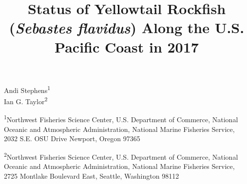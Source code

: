 \documentclass[12pt,]{article}
\title{Status of Yellowtail Rockfish (\emph{Sebastes flavidus}) Along the U.S.
Pacific Coast in 2017}
\author{}
\date{}
\begin{document}
\maketitle


\begin{center}
\thispagestyle{empty}


\vspace{.5cm}




Andi Stephens\textsuperscript{1}\\
Ian G. Taylor\textsuperscript{2}\\

\vspace{.5cm}

\small
\textsuperscript{1}Northwest Fisheries Science Center, U.S. Department of Commerce, National Oceanic and Atmospheric Administration, National Marine Fisheries Service, 2032 S.E. OSU Drive Newport, Oregon 97365\\

\vspace{.3cm}

\textsuperscript{2}Northwest Fisheries Science Center, U.S. Department of Commerce, National Oceanic and Atmospheric Administration, National Marine Fisheries Service, 2725 Montlake Boulevard East, Seattle, Washington 98112\\


\vspace{.5cm}


\end{center}
\end{document}
